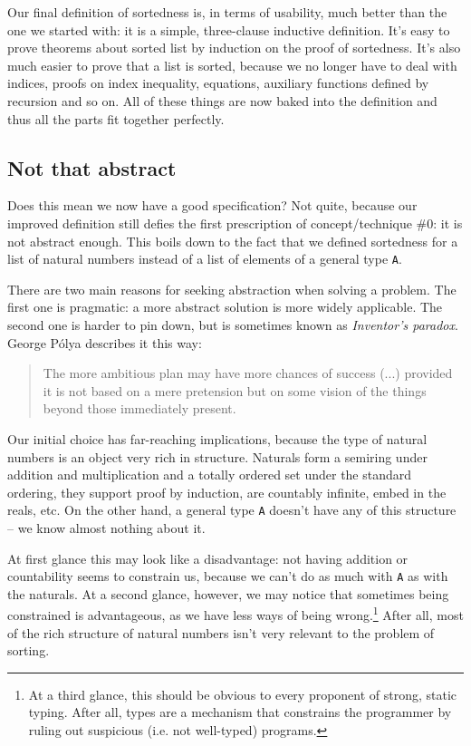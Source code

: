 \documentclass[declaration,mgr,english,shortabstract]{iithesis}
\newcommand{\m}[1]{\texttt{#1}}
\begin{document}
Our final definition of sortedness is, in terms of usability, much better than the one we started with: it is a simple, three-clause inductive definition. It's easy to prove theorems about sorted list by induction on the proof of sortedness. It's also much easier to prove that a list is sorted, because we no longer have to deal with indices, proofs on index inequality, equations, auxiliary functions defined by recursion and so on. All of these things are now baked into the definition and thus all the parts fit together perfectly.

\subsection{Not that abstract} \label{notabstract}

Does this mean we now have a good specification? Not quite, because our improved definition still defies the first prescription of concept/technique \#0: it is not abstract enough. This boils down to the fact that we defined sortedness for a list of natural numbers instead of a list of elements of a general type \m{A}.

There are two main reasons for seeking abstraction when solving a problem. The first one is pragmatic: a more abstract solution is more widely applicable. The second one is harder to pin down, but is sometimes known as \textit{Inventor's paradox}. George Pólya describes it this way:

\begin{quote}
    The more ambitious plan may have more chances of success (...) provided it is not based on a mere pretension but on some vision of the things beyond those immediately present.\cite{Polya}
\end{quote}

Our initial choice has far-reaching implications, because the type of natural numbers is an object very rich in structure. Naturals form a semiring under addition and multiplication and a totally ordered set under the standard ordering, they support proof by induction, are countably infinite, embed in the reals, etc. On the other hand, a general type \m{A} doesn't have any of this structure -- we know almost nothing about it.

At first glance this may look like a disadvantage: not having addition or countability seems to constrain us, because we can't do as much with \m{A} as with the naturals. At a second glance, however, we may notice that sometimes being constrained is advantageous, as we have less ways of being wrong.\footnote{At a third glance, this should be obvious to every proponent of strong, static typing. After all, types are a mechanism that constrains the programmer by ruling out suspicious (i.e. not well-typed) programs.} After all, most of the rich structure of natural numbers isn't very relevant to the problem of sorting.
\end{document}
